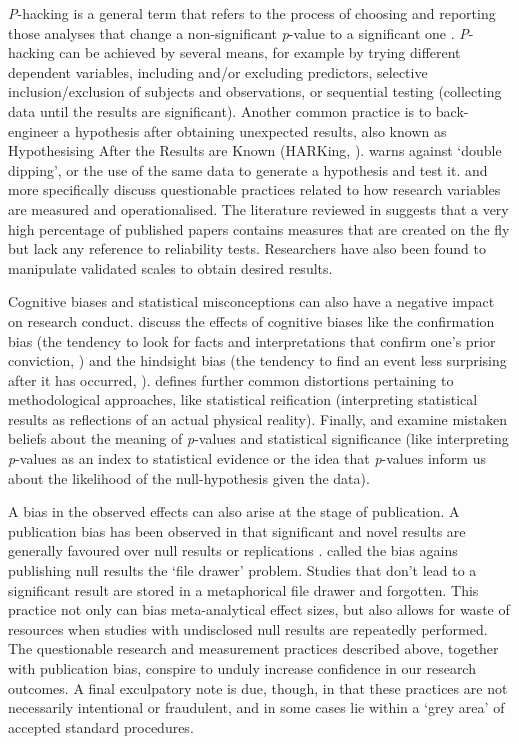 \documentclass[12pt,a4paper,]{article}
\begin{document}
\emph{P}-hacking is a general term that refers to the process of
choosing and reporting those analyses that change a non-significant
\emph{p}-value to a significant one
\citep{simmons2011, wagenmakers2007, motulsky2014}. \emph{P}-hacking can
be achieved by several means, for example by trying different dependent
variables, including and/or excluding predictors, selective
inclusion/exclusion of subjects and observations, or sequential testing
(collecting data until the results are significant). Another common
practice is to back-engineer a hypothesis after obtaining unexpected
results, also known as Hypothesising After the Results are Known
(HARKing, \citealt{kerr1998}). \citet{lieber2009} warns against `double
dipping', or the use of the same data to generate a hypothesis and test
it. \citet{morin2015} and \citet{flake2019} more specifically discuss
questionable practices related to how research variables are measured
and operationalised. The literature reviewed in \citet{flake2019}
suggests that a very high percentage of published papers contains
measures that are created on the fly but lack any reference to
reliability tests. Researchers have also been found to manipulate
validated scales to obtain desired results.

Cognitive biases and statistical misconceptions can also have a negative
impact on research conduct. \citet{wagenmakers2012} discuss the effects
of cognitive biases like the confirmation bias (the tendency to look for
facts and interpretations that confirm one's prior conviction,
\citealt{nickerson1998}) and the hindsight bias (the tendency to find an
event less surprising after it has occurred, \citealt{roese2012}).
\citet{greenland2017} defines further common distortions pertaining to
methodological approaches, like statistical reification (interpreting
statistical results as reflections of an actual physical reality).
Finally, \citet{wagenmakers2007} and \citet{motulsky2014} examine
mistaken beliefs about the meaning of \emph{p}-values and statistical
significance (like interpreting \emph{p}-values as an index to
statistical evidence or the idea that \emph{p}-values inform us about
the likelihood of the null-hypothesis given the data).

A bias in the observed effects can also arise at the stage of
publication. A publication bias has been observed in that significant
and novel results are generally favoured over null results or
replications
\citep{easterbrook1991, ioannidis2005, song2010, kicinski2013, nissen2016}.
\citet{rosenthal1979} called the bias agains publishing null results the
`file drawer' problem. Studies that don't lead to a significant result
are stored in a metaphorical file drawer and forgotten. This practice
not only can bias meta-analytical effect sizes, but also allows for
waste of resources when studies with undisclosed null results are
repeatedly performed. The questionable research and measurement
practices described above, together with publication bias, conspire to
unduly increase confidence in our research outcomes. A final exculpatory
note is due, though, in that these practices are not necessarily
intentional or fraudulent, and in some cases lie within a `grey area' of
accepted standard procedures.
\end{document}
